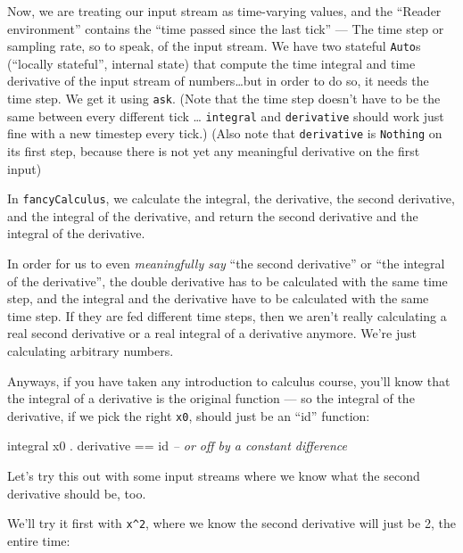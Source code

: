 \documentclass[]{article}
\newenvironment{Shaded}{}{}
\newcommand{\CommentTok}[1]{\textcolor[rgb]{0.38,0.63,0.69}{\textit{#1}}}
\newcommand{\FunctionTok}[1]{\textcolor[rgb]{0.02,0.16,0.49}{#1}}
\newcommand{\NormalTok}[1]{#1}
\begin{document}
Now, we are treating our input stream as time-varying values, and the ``Reader
environment'' contains the ``time passed since the last tick'' --- The time step
or sampling rate, so to speak, of the input stream. We have two stateful
\texttt{Auto}s (``locally stateful'', internal state) that compute the time
integral and time derivative of the input stream of numbers\ldots{}but in order
to do so, it needs the time step. We get it using \texttt{ask}. (Note that the
time step doesn't have to be the same between every different tick \ldots{}
\texttt{integral} and \texttt{derivative} should work just fine with a new
timestep every tick.) (Also note that \texttt{derivative} is \texttt{Nothing} on
its first step, because there is not yet any meaningful derivative on the first
input)

In \texttt{fancyCalculus}, we calculate the integral, the derivative, the second
derivative, and the integral of the derivative, and return the second derivative
and the integral of the derivative.

In order for us to even \emph{meaningfully say} ``the second derivative'' or
``the integral of the derivative'', the double derivative has to be calculated
with the same time step, and the integral and the derivative have to be
calculated with the same time step. If they are fed different time steps, then
we aren't really calculating a real second derivative or a real integral of a
derivative anymore. We're just calculating arbitrary numbers.

Anyways, if you have taken any introduction to calculus course, you'll know that
the integral of a derivative is the original function --- so the integral of the
derivative, if we pick the right \texttt{x0}, should just be an ``id'' function:

\begin{Shaded}
\begin{Highlighting}[]
\NormalTok{integral x0 }\FunctionTok{.}\NormalTok{ derivative }\FunctionTok{==}\NormalTok{ id      }\CommentTok{-- or off by a constant difference}
\end{Highlighting}
\end{Shaded}

Let's try this out with some input streams where we know what the second
derivative should be, too.

We'll try it first with \texttt{x\^{}2}, where we know the second derivative
will just be 2, the entire time:
\end{document}
